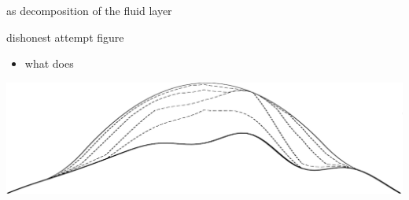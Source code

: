 \documentclass[svgnames,
               hyperref={colorlinks,citecolor=DeepPink4,linkcolor=FireBrick,urlcolor=Maroon},
               usepdftitle=false]  %
               {beamer}
\begin{document}
\begin{frame}{as decomposition of the fluid layer}

dishonest attempt figure

\begin{itemize}
\item what does 
\end{itemize}

\begin{center}
\includegraphics[width=\textwidth]{images/icedecomp.png}
\end{center}
\end{frame}
\end{document}
